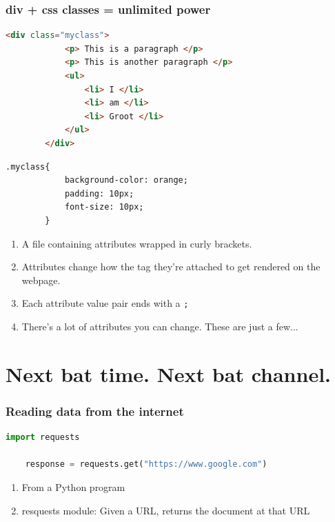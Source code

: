 \documentclass{beamer}
\begin{document}
%
%
\begin{frame}[fragile]
    \frametitle{div + css classes = unlimited power}
    \begin{minipage}{0.48\textwidth}
    \begin{lstlisting}[language=html, basicstyle=\tiny, autogobble]
        <div class="myclass">
            <p> This is a paragraph </p>
            <p> This is another paragraph </p>
            <ul>
                <li> I </li>
                <li> am </li>
                <li> Groot </li>
            </ul>
        </div>
    \end{lstlisting}
    \end{minipage}
    \hfill
    \begin{minipage}{0.44\textwidth}
    \begin{lstlisting}[language=html, basicstyle=\tiny, autogobble]
        .myclass{
            background-color: orange;
            padding: 10px;
            font-size: 10px;
        }
    \end{lstlisting} 
    \end{minipage}
    \vfill
    \begin{enumerate}[A]
        \item A file containing attributes wrapped in curly brackets.
        \item Attributes change how the tag they're attached to get rendered on the webpage.
        \item Each attribute value pair ends with a \lstinline|;|
        \item There's a lot of attributes you can change. These are just a few...
    \end{enumerate}
\end{frame}


\section{Next bat time. Next bat channel.}
%
%
\begin{frame}[fragile]
    \frametitle{Reading data from the internet}
    \begin{lstlisting}[language=Python, autogoggle]
    import requests

    response = requests.get("https://www.google.com")
    \end{lstlisting} 
    \vfill
    \begin{enumerate}[A]
        \item From a Python program
        \item resquests module: Given a URL, returns the document at that URL
    \end{enumerate}
\end{frame}
\end{document}
